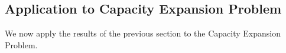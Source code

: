 \subsection{Application to Capacity Expansion Problem}

We now apply the results of the previous section to the Capacity Expansion Problem. 

